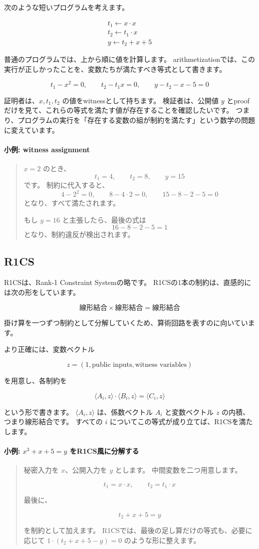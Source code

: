 \documentclass[a4paper,11pt]{ltjsarticle}
\newenvironment{examplebox}[1]{%
  \paragraph*{#1}\begin{quote}
}{%
  \end{quote}
}
\begin{document}
次のような短いプログラムを考えます。

\[
\begin{array}{l}
t_1 \leftarrow x\cdot x \\
t_2 \leftarrow t_1\cdot x \\
y \leftarrow t_2+x+5
\end{array}
\]

普通のプログラムでは、上から順に値を計算します。
arithmetizationでは、この実行が正しかったことを、変数たちが満たすべき等式として書きます。

\[
  t_1-x^2=0,\qquad
  t_2-t_1x=0,\qquad
  y-t_2-x-5=0
\]

証明者は、\(x,t_1,t_2\) の値をwitnessとして持ちます。
検証者は、公開値 \(y\) とproofだけを見て、これらの等式を満たす値が存在することを確認したいです。
つまり、プログラムの実行を「存在する変数の組が制約を満たす」という数学の問題に変えています。

\begin{examplebox}{小例: witness assignment}
\(x=2\) のとき、
\[
  t_1=4,\qquad t_2=8,\qquad y=15
\]
です。
制約に代入すると、
\[
  4-2^2=0,\qquad 8-4\cdot2=0,\qquad 15-8-2-5=0
\]
となり、すべて満たされます。

もし \(y=16\) と主張したら、最後の式は
\[
  16-8-2-5=1
\]
となり、制約違反が検出されます。
\end{examplebox}

\subsection{R1CS}

R1CSは、Rank-1 Constraint Systemの略です。
R1CSの1本の制約は、直感的には次の形をしています。

\[
  \text{線形結合}\times\text{線形結合}=\text{線形結合}
\]

掛け算を一つずつ制約として分解していくため、算術回路を表すのに向いています。

より正確には、変数ベクトル

\[
  z=(1,\text{public inputs},\text{witness variables})
\]

を用意し、各制約を

\[
  \langle A_i,z\rangle \cdot \langle B_i,z\rangle
  =
  \langle C_i,z\rangle
\]

という形で書きます。
\(\langle A_i,z\rangle\) は、係数ベクトル \(A_i\) と変数ベクトル \(z\) の内積、つまり線形結合です。
すべての \(i\) についてこの等式が成り立てば、R1CSを満たします。

\begin{examplebox}{小例: \(x^3+x+5=y\) をR1CS風に分解する}
秘密入力を \(x\)、公開入力を \(y\) とします。
中間変数を二つ用意します。

\[
  t_1 = x \cdot x,\qquad
  t_2 = t_1 \cdot x
\]

最後に、

\[
  t_2 + x + 5 = y
\]

を制約として加えます。
R1CSでは、最後の足し算だけの等式も、必要に応じて \(1 \cdot (t_2+x+5-y)=0\) のような形に整えます。
\end{examplebox}
\end{document}
